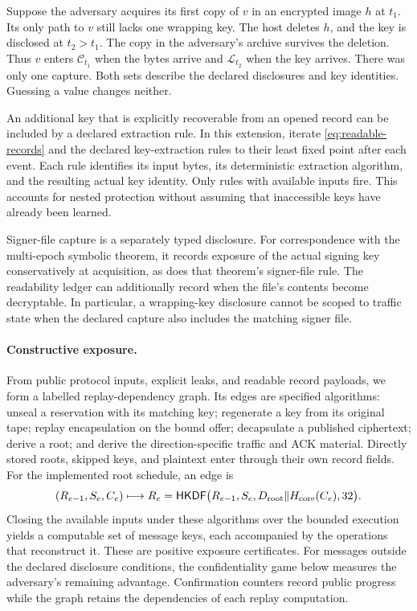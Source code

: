 Suppose the adversary acquires its first copy of $v$ in an encrypted
image $h$ at $t_1$. Its only path to $v$ still lacks one wrapping key.
The host deletes $h$, and the key is disclosed at $t_2>t_1$. The copy
in the adversary's archive survives the deletion. Thus $v$ enters
$\mathcal C_{t_1}$ when the bytes arrive and $\mathcal L_{t_2}$ when
the key arrives. There was only one capture. Both sets describe the
declared disclosures and key identities. Guessing a value changes neither.

An additional key that is explicitly recoverable from an opened record can be
included by a declared extraction rule.  In this extension, iterate
\eqref{eq:readable-records} and the declared key-extraction rules to their least
fixed point after each event.  Each rule identifies its input bytes, its
deterministic extraction algorithm, and the resulting actual key identity.
Only rules with available inputs fire.  This accounts for nested protection
without assuming that inaccessible keys have already been learned.

Signer-file capture is a separately typed disclosure.  For correspondence
with the multi-epoch symbolic theorem, it records exposure of the actual signing
key conservatively at acquisition, as does that theorem's signer-file rule.
The readability ledger can additionally record when the file's contents
become decryptable.  In particular, a wrapping-key disclosure cannot be
scoped to traffic state when the declared capture also includes the matching
signer file.

\paragraph{Constructive exposure.}
From public protocol inputs, explicit leaks, and readable record payloads, we
form a labelled replay-dependency graph.  Its edges are specified algorithms:
unseal a reservation with its matching key; regenerate a key from its original
tape; replay encapsulation on the bound offer; decapsulate a published
ciphertext; derive a root; and derive the direction-specific traffic and ACK
material.  Directly stored roots, skipped keys, and plaintext enter through
their own record fields.  For the implemented root schedule, an edge is
\[
 (R_{e-1},S_e,C_e)\longmapsto
 R_e=\mathsf{HKDF}\bigl(R_{e-1},S_e,
       D_{\rm root}\Vert H_{\rm core}(C_e),32\bigr).
\]
Closing the available inputs under these algorithms over the bounded
execution yields a computable set of message keys, each accompanied by the
operations that reconstruct it. These
are positive exposure certificates. For messages outside the declared
disclosure conditions, the confidentiality game below measures the adversary's
remaining advantage. Confirmation counters record public progress while the
graph retains the dependencies of each replay computation.

